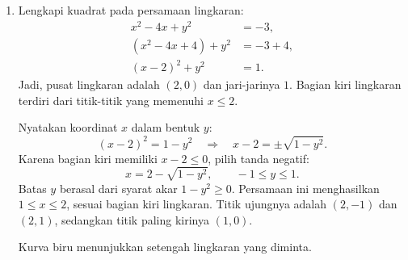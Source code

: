 \documentclass[11pt,a4paper]{article}
\begin{document}
\begin{enumerate}
    \textit{Catatan: jika interval $[1,5]$ hanya dimaksudkan untuk $g$,
    sedangkan $f$ memakai domain alami $[1,\infty)$, domain komposisinya menjadi $[1,5]$.}

  \item Lengkapi kuadrat pada persamaan lingkaran:
    \begin{align*}
      x^2-4x+y^2&=-3,\\
      (x^2-4x+4)+y^2&=-3+4,\\
      (x-2)^2+y^2&=1.
    \end{align*}
    Jadi, pusat lingkaran adalah $(2,0)$ dan jari-jarinya $1$.
    Bagian kiri lingkaran terdiri dari titik-titik yang memenuhi $x\le2$.

    Nyatakan koordinat $x$ dalam bentuk $y$:
    \[
      (x-2)^2=1-y^2\quad\Longrightarrow\quad x-2=\pm\sqrt{1-y^2}.
    \]
    Karena bagian kiri memiliki $x-2\le0$, pilih tanda negatif:
    \[
      \boxed{x=2-\sqrt{1-y^2},\qquad -1\le y\le1}.
    \]
    Batas $y$ berasal dari syarat akar $1-y^2\ge0$.
    Persamaan ini menghasilkan $1\le x\le2$, sesuai bagian kiri lingkaran.
    Titik ujungnya adalah $(2,-1)$ dan $(2,1)$, sedangkan titik paling kirinya $(1,0)$.

    \begin{center}
    \end{center}
    Kurva biru menunjukkan setengah lingkaran yang diminta.
\end{enumerate}
\end{document}
